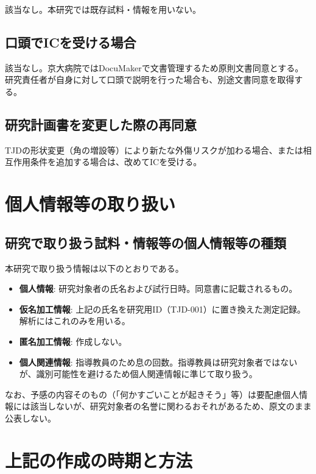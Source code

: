 \documentclass{kyodai-protocol}
\begin{document}
該当なし。本研究では既存試料・情報を用いない。

\subsection{口頭でICを受ける場合}

該当なし。京大病院ではDocuMakerで文書管理するため原則文書同意とする。研究責任者が自身に対して口頭で説明を行った場合も、別途文書同意を取得する。

\subsection{研究計画書を変更した際の再同意}

TJDの形状変更（角の増設等）により新たな外傷リスクが加わる場合、または相互作用条件を追加する場合は、改めてICを受ける。

\section{個人情報等の取り扱い}
\label{sec:privacy}

\subsection{研究で取り扱う試料・情報等の個人情報等の種類}

本研究で取り扱う情報は以下のとおりである。

\begin{itemize}
\item \textbf{個人情報}: 研究対象者の氏名および試行日時。同意書に記載されるもの。
\item \textbf{仮名加工情報}: 上記の氏名を研究用ID（TJD-001）に置き換えた測定記録。解析にはこれのみを用いる。
\item \textbf{匿名加工情報}: 作成しない。
\item \textbf{個人関連情報}: 指導教員のため息の回数。指導教員は研究対象者ではないが、識別可能性を避けるため個人関連情報に準じて取り扱う。
\end{itemize}

なお、予感の内容そのもの（「何かすごいことが起きそう」等）は要配慮個人情報には該当しないが、研究対象者の名誉に関わるおそれがあるため、原文のまま公表しない。

\section{上記の作成の時期と方法}
\end{document}
